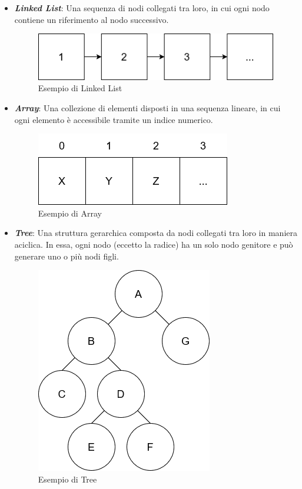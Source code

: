\documentclass[12pt,a4paper,openright,twoside]{book}
\begin{document}
        \begin{itemize}
            \item \textit{\textbf{Linked List}}: Una sequenza di nodi collegati tra loro, in cui ogni nodo contiene un riferimento al nodo successivo.
            \begin{figure} [h]
                \centering
                \includegraphics[width=.4\linewidth]{figures/LinkedList.png}
                \caption{Esempio di Linked List}
                \label{fig:linked-list}
            \end{figure}

            \item \textit{\textbf{Array}}: Una collezione di elementi disposti in una sequenza lineare, in cui ogni elemento è accessibile tramite un indice numerico.
            \begin{figure} [h]
                \centering
                \includegraphics[width=.3\linewidth]{figures/Array.png}
                \caption{Esempio di Array}
                \label{fig:array}
            \end{figure}

            \item \textit{\textbf{Tree}}: Una struttura gerarchica composta da nodi collegati tra loro in maniera aciclica. In essa, ogni nodo (eccetto la radice) ha un solo nodo genitore e può generare uno o più nodi figli.
            \begin{figure} [h]
                \centering
                \includegraphics[width=.25\linewidth]{figures/Tree.png}
                \caption{Esempio di Tree}
                \label{fig:generic-tree}
            \end{figure}


\end{itemize}
\end{document}
